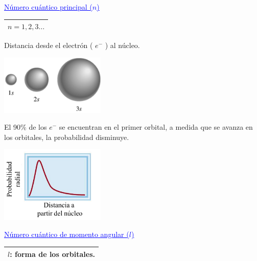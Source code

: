         \begin{center} \textcolor{blue}{\underline{Número cuántico principal ($n$)}} \end{center}
            \begin{center} 
                \begin{tabular}{| c |}
                    \hline
                    $n = 1,2,3 \dots $ \\
                    \hline
                \end{tabular}
            \end{center}
            \indent Distancia desde el electrón ( $e^-$ ) al núcleo.   
            \begin{center} \includegraphics[width=5cm]{./imagenes/numeroCuanticoPrincipal.png} \end{center}
            \indent El 90\% de los $e^-$ se encuentran en el primer orbital, a medida que se avanza en los orbitales, la probabilidad disminuye.
            \begin{center} \includegraphics[width=5cm]{./imagenes/encontrarElectronOrbital.png} \end{center}

        \begin{center} \textcolor{blue}{\underline{Número cuántico de momento angular ($l$)}} \end{center}
            \begin{center} 
                \begin{tabular}{| c |}
                    \hline
                    $l$: forma de los orbitales. \\
                    \hline
                \end{tabular}
            \end{center}

